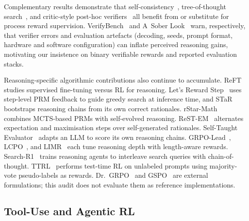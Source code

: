 Complementary results demonstrate that
self-consistency~\cite{wang2023selfconsistency}, tree-of-thought
search~\cite{yao2024tot}, and critic-style post-hoc
verifiers~\cite{mcaleese2024criticgpt} all benefit from or substitute for
process reward supervision. VerifyBench~\cite{zhang2025verifybench} and
A~Sober Look~\cite{hochlehnert2025sober} warn, respectively, that verifier
errors and evaluation artefacts (decoding, seeds, prompt format, hardware and
software configuration) can inflate perceived reasoning gains, motivating our
insistence on binary verifiable rewards and reported evaluation stacks.

Reasoning-specific algorithmic contributions also continue to accumulate.
ReFT~\cite{luong2024reft} studies supervised fine-tuning versus RL for
reasoning. Let's Reward Step~\cite{zhang2025rewardstep} uses step-level PRM
feedback to guide greedy search at inference time, and
STaR~\cite{zelikman2022star} bootstraps reasoning chains from its own
correct rationales. rStar-Math~\cite{guan2025rstarmath} combines MCTS-based PRMs
with self-evolved reasoning. ReST-EM~\cite{singh2024restem} alternates
expectation and maximisation steps over self-generated rationales.
Self-Taught Evaluator~\cite{wang2024stevaluator} adapts an LLM to score its
own reasoning chains. GRPO-Lead~\cite{lu2025grpolead}, LCPO~\cite{lu2025lcpo},
and LIMR~\cite{li2025limr} each tune reasoning depth with length-aware
rewards. Search-R1~\cite{jin2025searchr1} trains reasoning agents to
interleave search queries with chain-of-thought. TTRL~\cite{pu2025ttrl}
performs test-time RL on unlabeled prompts using majority-vote pseudo-labels
as rewards. Dr.~GRPO~\cite{tong2025drgrpo} and GSPO~\cite{qwen2025gspo} are external
formulations; this audit does not evaluate them as reference implementations.

\subsection{Tool-Use and Agentic RL}
\label{sec:related:tooluse}

